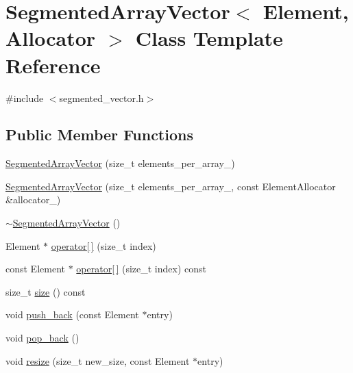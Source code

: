 \hypertarget{classSegmentedArrayVector}{\section{Segmented\-Array\-Vector$<$ Element, Allocator $>$ Class Template Reference}
\label{classSegmentedArrayVector}
}


{\ttfamily \#include $<$segmented\-\_\-vector.\-h$>$}

\subsection*{Public Member Functions}
\begin{DoxyCompactItemize}
\item 
\hyperlink{classSegmentedArrayVector_ac17dbea2f5c89d91ab5fc43147e36118}{Segmented\-Array\-Vector} (size\-\_\-t elements\-\_\-per\-\_\-array\-\_\-)
\item 
\hyperlink{classSegmentedArrayVector_a1de81b80c2fbba50be8733b853127956}{Segmented\-Array\-Vector} (size\-\_\-t elements\-\_\-per\-\_\-array\-\_\-, const Element\-Allocator \&allocator\-\_\-)
\item 
\hyperlink{classSegmentedArrayVector_a726619d3b1d216b6980313a653ee7f68}{$\sim$\-Segmented\-Array\-Vector} ()
\item 
Element $\ast$ \hyperlink{classSegmentedArrayVector_aada885ec25b0c19294204de4b19fd90e}{operator\mbox{[}$\,$\mbox{]}} (size\-\_\-t index)
\item 
const Element $\ast$ \hyperlink{classSegmentedArrayVector_a1bc6d1e8c955ec83bc708bc6fa9ffdbc}{operator\mbox{[}$\,$\mbox{]}} (size\-\_\-t index) const 
\item 
size\-\_\-t \hyperlink{classSegmentedArrayVector_a6efe1e990f0e94d743b8d5e996be32af}{size} () const 
\item 
void \hyperlink{classSegmentedArrayVector_a81171a5200eb39fe7a77fff837bec77c}{push\-\_\-back} (const Element $\ast$entry)
\item 
void \hyperlink{classSegmentedArrayVector_a334007fae5874508618d6ca45547250b}{pop\-\_\-back} ()
\item 
void \hyperlink{classSegmentedArrayVector_a28f4fdd005ee4cc66dd8ae63987879c2}{resize} (size\-\_\-t new\-\_\-size, const Element $\ast$entry)
\end{DoxyCompactItemize}


